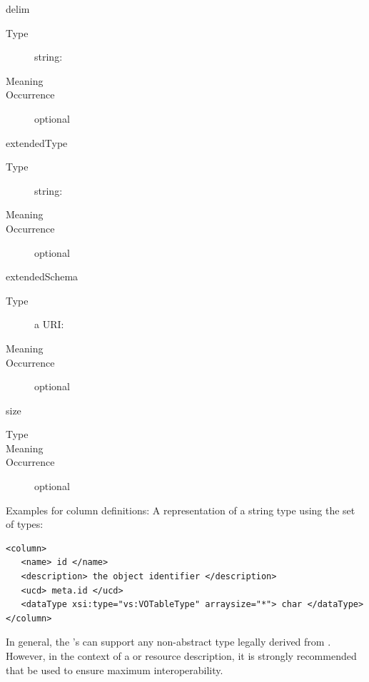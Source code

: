 \documentclass[11pt,a4paper]{ivoa}
\begin{document}
\begin{generated}
\begin{bigdescription}
\begin{description}
\end{description}
\item[delim]
\begin{description}
\item[Type] string: 
\item[Meaning] 
\item[Occurrence] optional
 
\end{description}
\item[extendedType]
\begin{description}
\item[Type] string: 
\item[Meaning] 
\item[Occurrence] optional
\end{description}
\item[extendedSchema]
\begin{description}
\item[Type] a URI: 
\item[Meaning] 
\item[Occurrence] optional
\end{description}
\item[size]
\begin{description}
\item[Type] 
\item[Meaning] 
\item[Occurrence] optional
\end{description}


\end{bigdescription}\endgroup

\endgroup
\end{generated}





Examples for column definitions:
A representation of a string type using the
 set of types:

\begin{lstlisting}
<column>
   <name> id </name>
   <description> the object identifier </description>
   <ucd> meta.id </ucd>
   <dataType xsi:type="vs:VOTableType" arraysize="*"> char </dataType>
</column>
\end{lstlisting}




In general, the 's 
can support any non-abstract type legally derived from
.  However, in the context of a
 or 
resource description, it is strongly recommended that 
  be used to
ensure maximum interoperability.  
\end{document}
